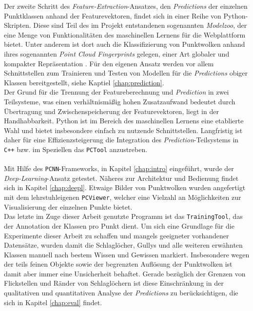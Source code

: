 Der zweite Schritt des \textit{Feature-Extraction}-Ansatzes, den \textit{Predictions} der einzelnen Punktklassen anhand der Featurevektoren, findet sich in einer Reihe von Python-Skripten. Diese sind Teil des im Projekt entstandenen sogenannten \textit{Modelzoo}, der eine Menge von Funktionalitäten des maschinellen Lernens für die Webplattform \citep{Schilling-2021} bietet. Unter anderem ist dort auch die Klassifizierung von Punktwolken anhand ihres sogenannten \textit{Point Cloud Fingerprints} gelegen, einer Art globaler und kompakter Repräsentation \citep{Kirsten-2021}. Für den eigenen Ansatz werden vor allem Schnittstellen zum Trainieren und Testen von Modellen für die \textit{Predictions} obiger Klassen bereitgestellt, siehe Kaptiel \ref{chap:prediction}. \\
Der Grund für die Trennung der Featureberechnung und \textit{Prediction} in zwei Teilsysteme, was einen verhältnismäßig hohen Zusatzaufwand bedeutet durch Übertragung und Zwischenspeicherung der Featurevektoren, liegt in der Handhabbarkeit. Python ist im Bereich des maschinellen Lernens eine etablierte Wahl und bietet insbesondere einfach zu nutzende Schnittstellen. Langfristig ist daher für eine Effizienzsteigerung die Integration des \textit{Prediction}-Teilsystems in \texttt{C++} bzw. im Speziellen das \texttt{PCTool} anzustreben. \\\\
Mit Hilfe des \texttt{PCNN}-Frameworks, in Kapitel \ref{chap:intro} eingeführt, wurde der \textit{Deep-Learning}-Ansatz getestet. Näheres zur Architektur und Bedienung findet sich in Kapitel \ref{chap:deepl}. Etwaige Bilder von Punktwolken wurden angefertigt mit dem lehrstuhleigenen \texttt{PCViewer}, welcher eine Vielzahl an Möglichkeiten zur Visualisierung der einzelnen Punkte bietet. \\
Das letzte im Zuge dieser Arbeit genutzte Programm ist das \texttt{TrainingTool}, das der Annotation der Klassen pro Punkt dient. Um sich eine Grundlage für die Experimente dieser Arbeit zu schaffen und mangels geeigneter vorhandener Datensätze, wurden damit die Schlaglöcher, Gullys und alle weiteren erwähnten Klassen manuell nach bestem Wissen und Gewissen markiert. Insbesondere wegen der teils feinen Objekte sowie der begrenzten Auflösung der Punktwolken ist damit aber immer eine Unsicherheit behaftet. Gerade bezüglich der Grenzen von Flickstellen und Ränder von Schlaglöchern ist diese Einschränkung in der qualitativen und quantitativen Analyse der \textit{Predictions} zu berücksichtigen, die sich in Kapitel \ref{chap:eval} findet.